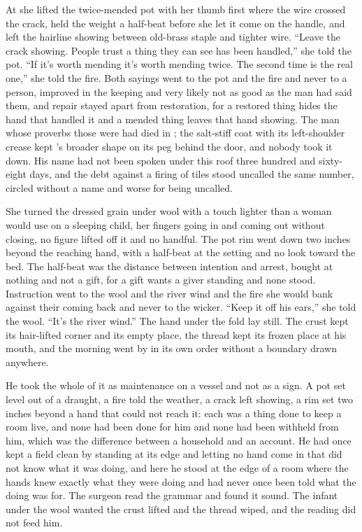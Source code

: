 At  she lifted the twice-mended pot with her thumb first where the wire crossed the crack, held the weight a half-beat before she let it come on the handle, and left the hairline showing between old-brass staple and tighter wire. “Leave the crack showing. People trust a thing they can see has been handled,” she told the pot. “If it's worth mending it's worth mending twice. The second time is the real one,” she told the fire. Both sayings went to the pot and the fire and never to a person, improved in the keeping and very likely not as good as the man had said them, and repair stayed apart from restoration, for a restored thing hides the hand that handled it and a mended thing leaves that hand showing. The man whose proverbs those were had died in ; the salt-stiff coat with its left-shoulder crease kept 's broader shape on its peg behind the door, and nobody took it down. His name had not been spoken under this roof three hundred and sixty-eight days, and the debt against a firing of tiles stood uncalled the same number, circled without a name and worse for being uncalled.

She turned the dressed grain under wool with a touch lighter than a woman would use on a sleeping child, her fingers going in and coming out without closing, no figure lifted off it and no handful. The pot rim went down two inches beyond the reaching hand, with a half-beat at the setting and no look toward the bed. The half-beat was the distance between intention and arrest, bought at nothing and not a gift, for a gift wants a giver standing and none stood. Instruction went to the wool and the river wind and the fire she would bank against their coming back and never to the wicker. “Keep it off his ears,” she told the wool. “It's the river wind.” The hand under the fold lay still. The crust kept its hair-lifted corner and its empty place, the thread kept its frozen place at his mouth, and the morning went by in its own order without a boundary drawn anywhere.

He took the whole of it as maintenance on a vessel and not as a sign. A pot set level out of a draught, a fire told the weather, a crack left showing, a rim set two inches beyond a hand that could not reach it: each was a thing done to keep a room live, and none had been done for him and none had been withheld from him, which was the difference between a household and an account. He had once kept a field clean by standing at its edge and letting no hand come in that did not know what it was doing, and here he stood at the edge of a room where the hands knew exactly what they were doing and had never once been told what the doing was for. The surgeon read the grammar and found it sound. The infant under the wool wanted the crust lifted and the thread wiped, and the reading did not feed him.

